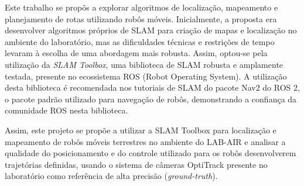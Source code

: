 


\label{Cap03:Metodologia}
Este trabalho se propôs a explorar algoritmos de localização, mapeamento e planejamento de rotas utilizando robôs móveis. Inicialmente, a proposta era desenvolver algoritmos próprios de SLAM para criação de mapas e localização no ambiente do laboratório, mas as dificuldades técnicas e restrições de tempo levaram à escolha de uma abordagem mais robusta. Assim, optou-se pela utilização da \textit{SLAM Toolbox}\cite{site:Slam_toolbox}, uma biblioteca de SLAM robusta e amplamente testada, presente no ecossistema ROS (Robot Operating System). A utilização desta biblioteca é recomendada nos tutoriais de SLAM do pacote Nav2 do ROS 2, o pacote padrão utilizado para navegação de robôs, demonstrando a confiança da comunidade ROS nesta biblioteca.

Assim, este projeto se propõe a utilizar a SLAM Toolbox para localização e mapeamento de robôs móveis terrestres no ambiente do LAB-AIR e analisar a qualidade do posicionamento e do controle utilizado para os robôs desenvolverem trajetórias definidas, usando o sistema de câmeras OptiTrack presente no laboratório como referência de alta precisão (\textit{ground-truth}).

